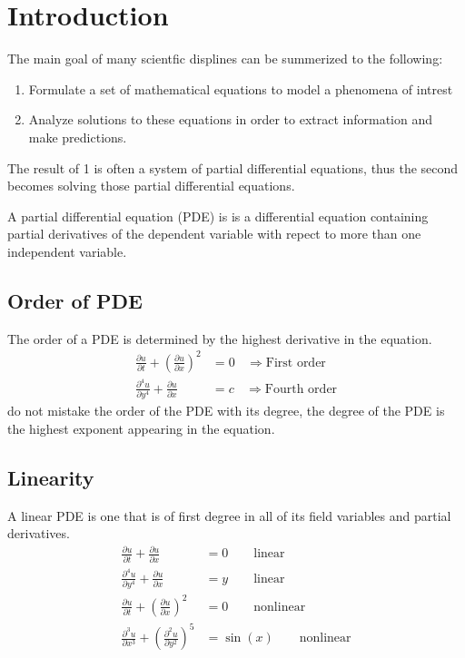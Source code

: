 \documentclass[]{article}
\begin{document}
\newpage

\tableofcontents

\newpage

\section{Introduction}
The main goal of many scientfic displines can be summerized to the following:

\begin{enumerate}
\item Formulate a set of mathematical equations to model a phenomena of intrest
\item Analyze solutions to these equations in order to extract information and make predictions.
\end{enumerate}

The result of 1 is often a system of partial differential equations, thus the second becomes solving those partial differential equations.
\par
A partial differential equation (PDE) is is a differential equation containing partial derivatives of the dependent variable with repect to more than one independent variable.

\subsection{Order of PDE}
The order of a PDE is determined by the highest derivative in the equation.
\begin{align*}
\frac{\partial u}{\partial t} + {(\frac{\partial u}{\partial x})}^2 &= 0 \ \ \ \ \Longrightarrow  \text{First order}
\\
\frac{\partial^4 u}{\partial y^4} + \frac{\partial u}{\partial x} &= c \ \ \ \ \Longrightarrow  \text{Fourth order}
\end{align*}
do not mistake the order of the PDE with its degree, the degree of the PDE is the highest exponent appearing in the equation.
\subsection{Linearity} 
A linear PDE is one that is of first degree in all of its field variables and partial derivatives.
\begin{align*}
\frac{\partial u}{\partial t} + \frac{\partial u}{\partial x} &= 0 \quad\quad \text{linear}
\\
\frac{\partial^4 u}{\partial y^4} + \frac{\partial u}{\partial x} &= y \quad\quad \text{linear}
\\
\frac{\partial u}{\partial t} + {(\frac{\partial u}{\partial x})}^2 &= 0 \quad\quad \text{nonlinear}
\\
\frac{\partial^3 u}{\partial x^3} + {(\frac{\partial^2 u}{\partial y^2})}^5 &= \sin(x) \quad\quad \text{nonlinear}
\end{align*}
\end{document}
